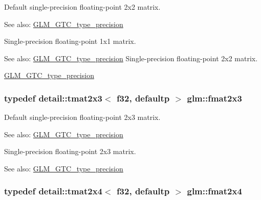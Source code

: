 Default single-precision floating-point 2x2 matrix. \begin{Desc}
\item[See also:]\hyperlink{group__gtc__type__precision}{GLM\_\-GTC\_\-type\_\-precision}\end{Desc}
Single-precision floating-point 1x1 matrix. \begin{Desc}
\item[See also:]\hyperlink{group__gtc__type__precision}{GLM\_\-GTC\_\-type\_\-precision} Single-precision floating-point 2x2 matrix. 

\hyperlink{group__gtc__type__precision}{GLM\_\-GTC\_\-type\_\-precision} \end{Desc}
\hypertarget{group__gtc__type__precision_g087d875cd4e384f101a28a4caf8ccd94}{
\subsubsection[fmat2x3]{\setlength{\rightskip}{0pt plus 5cm}typedef detail::tmat2x3$<$ f32, defaultp $>$ {\bf glm::fmat2x3}}}
\label{group__gtc__type__precision_g087d875cd4e384f101a28a4caf8ccd94}


Default single-precision floating-point 2x3 matrix. \begin{Desc}
\item[See also:]\hyperlink{group__gtc__type__precision}{GLM\_\-GTC\_\-type\_\-precision}\end{Desc}
Single-precision floating-point 2x3 matrix. \begin{Desc}
\item[See also:]\hyperlink{group__gtc__type__precision}{GLM\_\-GTC\_\-type\_\-precision} \end{Desc}
\hypertarget{group__gtc__type__precision_gf3af7a2f10aaf8028a95b7232b24d84e}{
\subsubsection[fmat2x4]{\setlength{\rightskip}{0pt plus 5cm}typedef detail::tmat2x4$<$ f32, defaultp $>$ {\bf glm::fmat2x4}}}
\label{group__gtc__type__precision_gf3af7a2f10aaf8028a95b7232b24d84e}



